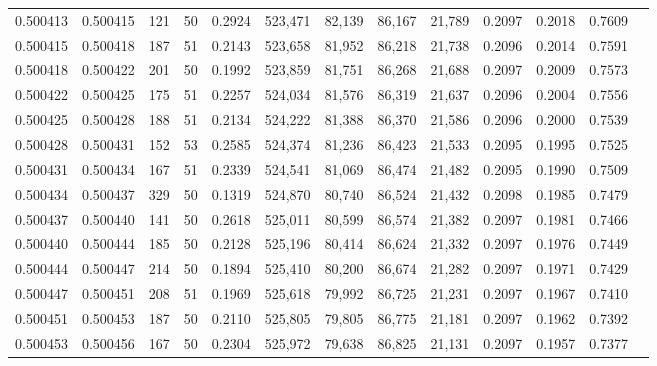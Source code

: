 \begin{tabular}{rrrrrrrrrrrrr}
0.500413 & 0.500415 & 121 &  50 &                                     0.2924 & 523,471 &  82,139 &  86,167 &  21,789 & 0.2097 & 0.2018 & 0.7609 \\
0.500415 & 0.500418 & 187 &  51 &                                     0.2143 & 523,658 &  81,952 &  86,218 &  21,738 & 0.2096 & 0.2014 & 0.7591 \\
0.500418 & 0.500422 & 201 &  50 &                                     0.1992 & 523,859 &  81,751 &  86,268 &  21,688 & 0.2097 & 0.2009 & 0.7573 \\
0.500422 & 0.500425 & 175 &  51 &                                     0.2257 & 524,034 &  81,576 &  86,319 &  21,637 & 0.2096 & 0.2004 & 0.7556 \\
0.500425 & 0.500428 & 188 &  51 &                                     0.2134 & 524,222 &  81,388 &  86,370 &  21,586 & 0.2096 & 0.2000 & 0.7539 \\
0.500428 & 0.500431 & 152 &  53 &                                     0.2585 & 524,374 &  81,236 &  86,423 &  21,533 & 0.2095 & 0.1995 & 0.7525 \\
0.500431 & 0.500434 & 167 &  51 &                                     0.2339 & 524,541 &  81,069 &  86,474 &  21,482 & 0.2095 & 0.1990 & 0.7509 \\
0.500434 & 0.500437 & 329 &  50 &                                     0.1319 & 524,870 &  80,740 &  86,524 &  21,432 & 0.2098 & 0.1985 & 0.7479 \\
0.500437 & 0.500440 & 141 &  50 &                                     0.2618 & 525,011 &  80,599 &  86,574 &  21,382 & 0.2097 & 0.1981 & 0.7466 \\
0.500440 & 0.500444 & 185 &  50 &                                     0.2128 & 525,196 &  80,414 &  86,624 &  21,332 & 0.2097 & 0.1976 & 0.7449 \\
0.500444 & 0.500447 & 214 &  50 &                                     0.1894 & 525,410 &  80,200 &  86,674 &  21,282 & 0.2097 & 0.1971 & 0.7429 \\
0.500447 & 0.500451 & 208 &  51 &                                     0.1969 & 525,618 &  79,992 &  86,725 &  21,231 & 0.2097 & 0.1967 & 0.7410 \\
0.500451 & 0.500453 & 187 &  50 &                                     0.2110 & 525,805 &  79,805 &  86,775 &  21,181 & 0.2097 & 0.1962 & 0.7392 \\
0.500453 & 0.500456 & 167 &  50 &                                     0.2304 & 525,972 &  79,638 &  86,825 &  21,131 & 0.2097 & 0.1957 & 0.7377 \\

\end{tabular}
